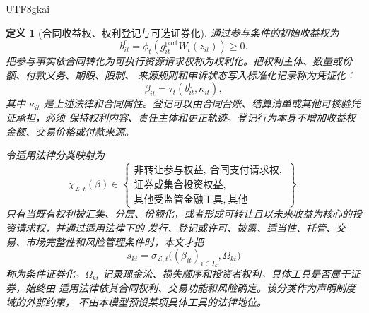 \documentclass[12pt,a4paper,openany]{report}
\newtheorem{definition}{定义}[chapter]
\begin{document}
\begin{CJK*}{UTF8}{gkai}
\begin{definition}[合同收益权、权利登记与可选证券化]
\label{def:rights-registration-finance}
通过参与条件的初始收益权为
\[
  b_{it}^{0}
  =\phi_t\!\left(g_{it}^{\mathrm{part}}W_t(z_{it})\right)\ge0.
\]
把参与事实依合同转化为可执行资源请求权称为\emph{权利化}。把权利主体、数量或份额、付款义务、期限、限制、
来源规则和申诉状态写入标准化记录称为\emph{凭证化}：
\[
  \beta_{it}=\tau_t\!\left(b_{it}^{0},\kappa_{it}\right),
\]
其中 \(\kappa_{it}\) 是上述法律和合同属性。登记可以由合同台账、结算清单或其他可核验凭证承担，必须
保持权利内容、责任主体和更正轨迹。登记行为本身不增加收益权金额、交易价格或付款来源。

令适用法律分类映射为
\[
  \chi_{\mathcal L,t}(\beta)
  \in
  \left\{
  \begin{gathered}
    \text{非转让参与权益},\ \text{合同支付请求权},\\
    \text{证券或集合投资权益},\\
    \text{其他受监管金融工具},\ \text{其他}
  \end{gathered}
  \right\}.
\]
只有当既有权利被汇集、分层、份额化，或者形成可转让且以未来收益为核心的投资请求权，并通过适用法律下的
发行、登记或许可、披露、适当性、托管、交易、市场完整性和风险管理条件时，本文才把
\[
  s_{kt}=\sigma_{\mathcal L,t}\bigl((\beta_{it})_{i\in I_k},\Omega_{kt}\bigr)
\]
称为\emph{条件证券化}。\(\Omega_{kt}\) 记录现金流、损失顺序和投资者权利。具体工具是否属于证券，始终由
适用法律依其合同权利、交易功能和风险确定。该分类作为声明制度域的外部约束，
不由本模型预设某项具体工具的法律地位。
\end{definition}


\end{CJK*}
\end{document}
